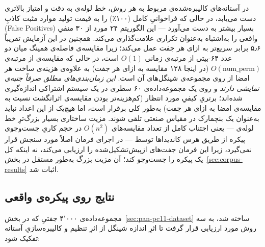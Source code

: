 \documentclass[11pt,a4paper]{article}
\begin{document}
	در آستانه‌های کالیبره‌شده‌ی مربوط به هر روش، خط لوله‌ی  به دقت و امتیاز  بالاتری دست می‌یابد، در حالی که  فراخوانیِ کامل (۱۰۰٪) را به قیمت تولید موارد مثبت کاذبِ (False Positives) بسیار بیشتر به دست می‌آورد — این الگوریتم ۲۴ مورد از ۳۰ منفیِ واقعی را به‌اشتباه به‌عنوان تکراری علامت‌گذاری می‌کند. همچنین  در این آزمایش تقریباً ۵٫۶ برابر سریع‌تر به ازای هر جفت عمل می‌کند؛ زیرا مقایسه‌ی فاصله‌ی همینگ میان دو عدد ۶۴-بیتی از مرتبه‌ی زمانی $O(1)$ است، در حالی که مقایسه‌ی  از مرتبه‌ی $O(\text{num\_perm})$ (در اینجا ۱۲۸ مقایسه به ازای هر جفت) به علاوه‌ی هزینه‌ی ساخت هر امضا از روی مجموعه‌ی شینگل‌های آن است. \emph{این زمان‌بندی‌های مطلق صرفاً جنبه‌ی نمایشی دارند} و روی یک مجموعه‌داده‌ی ۶۰ سطری در یک سیستم اشتراکی اندازه‌گیری شده‌اند؛ برتریِ کیفیِ مورد انتظار (کم‌هزینه‌تر بودن مقایسه‌ی اثرانگشت نسبت به مقایسه‌ی امضا به ازای هر جفت) به‌طور کلی برقرار است، اما هیچ‌یک از این اعداد نباید به‌عنوان یک بنچمارک در مقیاس صنعتی تلقی شوند. مزیت ساختاری بسیار بزرگ‌ترِ خط لوله‌ی  — یعنی اجتناب کامل از تعداد مقایسه‌های $O(n^2)$ در حجم کاریِ جست‌وجوی پیکره از طریق هرس کاندیداها توسط  — در اجرای فرمان  اصلاً مورد سنجش قرار نمی‌گیرد، زیرا این فرمان جفت‌های ازپیش‌تشکیل‌شده را ارزیابی می‌کند، نه اینکه کل یک پیکره را جست‌وجو کند؛ آن مزیت بزرگ به‌طور مستقل در بخش~\ref{sec:corpus-results} اثبات شد.
	
	\subsection{نتایج روی پیکره‌ی واقعی }
	\label{sec:pan-pc11-results}
	
	مجموعه‌داده‌ی ۴٬۰۰۰ جفتیِ  که در بخش~\ref{sec:pan-pc11-dataset} ساخته شد، به سه روش مورد ارزیابی قرار گرفت تا اثرِ اندازه شینگل از اثرِ تنظیم و کالیبره‌سازیِ آستانه تفکیک شود:
	
\end{document}
